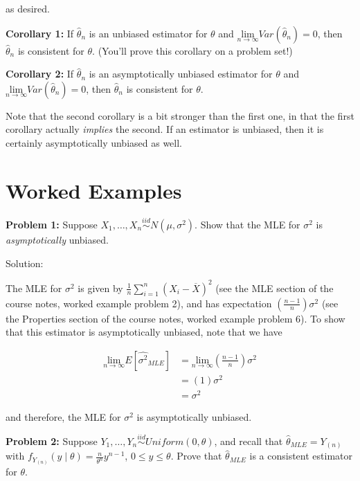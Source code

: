 \documentclass[
  letterpaper,
  DIV=11,
  numbers=noendperiod]{scrreprt}
\begin{document}
as desired.

\textbf{Corollary 1:} If \(\hat{\theta}_n\) is an unbiased estimator for
\(\theta\) and
\(\underset{n \to \infty}{\text{lim}} Var(\hat{\theta}_n) = 0\), then
\(\hat{\theta}_n\) is consistent for \(\theta\). (You'll prove this
corollary on a problem set!)

\textbf{Corollary 2:} If \(\hat{\theta}_n\) is an asymptotically
unbiased estimator for \(\theta\) and
\(\underset{n \to \infty}{\text{lim}} Var(\hat{\theta}_n) = 0\), then
\(\hat{\theta}_n\) is consistent for \(\theta\).

Note that the second corollary is a bit stronger than the first one, in
that the first corollary actually \emph{implies} the second. If an
estimator is unbiased, then it is certainly asymptotically unbiased as
well.

\section{Worked Examples}\label{worked-examples-4}

\textbf{Problem 1:} Suppose
\(X_1, \dots, X_n \overset{iid}{\sim} N(\mu, \sigma^2)\). Show that the
MLE for \(\sigma^2\) is \emph{asymptotically} unbiased.

Solution:

The MLE for \(\sigma^2\) is given by
\(\frac{1}{n} \sum_{i = 1}^n (X_i - \overline{X})^2\) (see the MLE
section of the course notes, worked example problem 2), and has
expectation \(\left( \frac{n-1}{n} \right)\sigma^2\) (see the Properties
section of the course notes, worked example problem 6). To show that
this estimator is asymptotically unbiased, note that we have

\begin{align*}
    \underset{n\to \infty}{\text{lim}} E[\hat{\sigma^2}_{MLE}] & = \underset{n\to \infty}{\text{lim}} \left( \frac{n-1}{n} \right) \sigma^2 \\
    & = \left( 1 \right) \sigma^2 \\
    & = \sigma^2
\end{align*}

and therefore, the MLE for \(\sigma^2\) is asymptotically unbiased.

\textbf{Problem 2:} Suppose
\(Y_1, \dots, Y_n \overset{iid}{\sim} Uniform(0, \theta)\), and recall
that \(\hat{\theta}_{MLE} = Y_{(n)}\) with
\(f_{Y_{(n)}}(y \mid \theta) = \frac{n}{\theta^n} y^{n-1}\),
\(0 \leq y \leq \theta\). Prove that \(\hat{\theta}_{MLE}\) is a
consistent estimator for \(\theta\).
\end{document}
